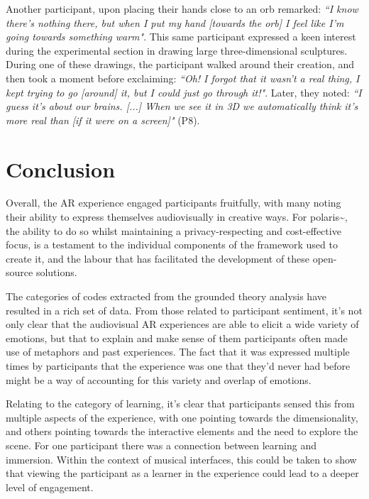 Another participant, upon placing their hands close to an orb remarked: \textit{``I know there’s nothing there, but when I put my hand [towards the orb] I feel like I’m going towards something warm"}. This same participant expressed a keen interest during the experimental section in drawing large three-dimensional sculptures. During one of these drawings, the participant walked around their creation, and then took a moment before exclaiming: \textit{``Oh! I forgot that it wasn’t a real thing, I kept trying to go [around] it, but I could just go through it!"}. Later, they noted: \textit{``I guess it’s about our brains. [...] When we see it in 3D we automatically think it’s more real than [if it were on a screen]"} (P8).

\section{Conclusion}\label{sec: polaris-conclusion}
Overall, the AR experience engaged participants fruitfully, with many noting their ability to express themselves audiovisually in creative ways. For polaris\textasciitilde{}, the ability to do so whilst maintaining a privacy-respecting and cost-effective focus, is a testament to the individual components of the framework used to create it, and the labour that has facilitated the development of these open-source solutions.

The categories of codes extracted from the grounded theory analysis have resulted in a rich set of data. From those related to participant sentiment, it’s not only clear that the audiovisual AR experiences are able to elicit a wide variety of emotions, but that to explain and make sense of them participants often made use of metaphors and past experiences. The fact that it was expressed multiple times by participants that the experience was one that they’d never had before might be a way of accounting for this variety and overlap of emotions.

Relating to the category of learning, it’s clear that participants sensed this from multiple aspects of the experience, with one pointing towards the dimensionality, and others pointing towards the interactive elements and the need to explore the scene. For one participant there was a connection between learning and immersion. Within the context of musical interfaces, this could be taken to show that viewing the participant as a learner in the experience could lead to a deeper level of engagement.

